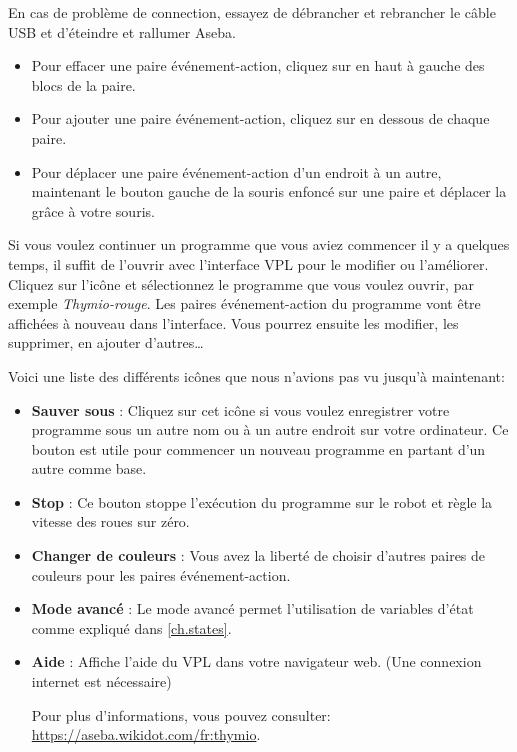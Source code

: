 En cas de problème de connection, essayez de débrancher et rebrancher le câble USB et d'éteindre et rallumer Aseba.


\begin{itemize}
\item Pour effacer une paire événement-action, cliquez sur  en haut à gauche des blocs de la paire.
\item Pour ajouter une paire événement-action, cliquez sur  en dessous de chaque paire.
\item Pour déplacer une paire événement-action d'un endroit à un autre, maintenant le bouton gauche de la souris enfoncé sur une paire et déplacer la grâce à votre souris.
\end{itemize}


Si vous voulez continuer un programme que vous aviez commencer il y a quelques temps, il suffit de l'ouvrir avec l'interface VPL pour le modifier ou l'améliorer. Cliquez sur l'icône  et sélectionnez le programme que vous voulez ouvrir, par exemple \textit{Thymio-rouge}. Les paires événement-action du programme vont être affichées à nouveau dans l'interface. Vous pourrez ensuite les modifier, les supprimer, en ajouter d'autres\ldots


Voici une liste des différents icônes que nous n'avions pas vu jusqu'à maintenant:

\begin{itemize}

\item \textbf{Sauver sous} : Cliquez sur cet icône si vous voulez enregistrer votre programme sous un autre nom ou à un autre endroit sur votre ordinateur. Ce bouton est utile pour commencer un nouveau programme en partant d'un autre comme base.

\item \textbf{Stop} : Ce bouton stoppe l'exécution du programme sur le robot et règle la vitesse des roues sur zéro.

\item \textbf{Changer de couleurs} : Vous avez la liberté de choisir d'autres paires de couleurs pour les paires événement-action.

\item \textbf{Mode avancé} : Le mode avancé permet l'utilisation de variables d'état comme expliqué dans \cref{ch.states}.

\item \textbf{Aide} : Affiche l'aide du VPL dans votre navigateur web. (Une connexion internet est nécessaire)

Pour plus d'informations, vous pouvez consulter:
\url{https://aseba.wikidot.com/fr:thymio}.

\end{itemize}
